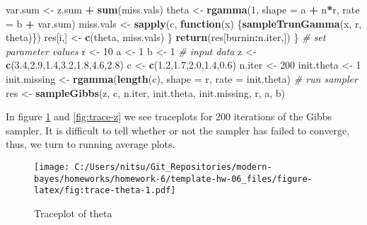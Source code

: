 \documentclass[
]{article}
\newenvironment{Shaded}{\begin{snugshade}}{\end{snugshade}}
\newcommand{\CommentTok}[1]{\textcolor[rgb]{0.56,0.35,0.01}{\textit{#1}}}
\newcommand{\ControlFlowTok}[1]{\textcolor[rgb]{0.13,0.29,0.53}{\textbf{#1}}}
\newcommand{\DataTypeTok}[1]{\textcolor[rgb]{0.13,0.29,0.53}{#1}}
\newcommand{\DecValTok}[1]{\textcolor[rgb]{0.00,0.00,0.81}{#1}}
\newcommand{\FloatTok}[1]{\textcolor[rgb]{0.00,0.00,0.81}{#1}}
\newcommand{\KeywordTok}[1]{\textcolor[rgb]{0.13,0.29,0.53}{\textbf{#1}}}
\newcommand{\NormalTok}[1]{#1}
\newcommand{\OperatorTok}[1]{\textcolor[rgb]{0.81,0.36,0.00}{\textbf{#1}}}
\newcommand{\StringTok}[1]{\textcolor[rgb]{0.31,0.60,0.02}{#1}}
\begin{document}
\begin{Shaded}
\begin{Highlighting}[]
\NormalTok{    var.sum \textless{}{-}}\StringTok{ }\NormalTok{z.sum }\OperatorTok{+}\StringTok{ }\KeywordTok{sum}\NormalTok{(miss.vals)}
\NormalTok{    theta \textless{}{-}}\StringTok{ }\KeywordTok{rgamma}\NormalTok{(}\DecValTok{1}\NormalTok{, }\DataTypeTok{shape =}\NormalTok{ a }\OperatorTok{+}\StringTok{ }\NormalTok{n}\OperatorTok{*}\NormalTok{r, }\DataTypeTok{rate =}\NormalTok{ b }\OperatorTok{+}\StringTok{ }\NormalTok{var.sum)}
\NormalTok{    miss.vals \textless{}{-}}\StringTok{ }\KeywordTok{sapply}\NormalTok{(c, }\ControlFlowTok{function}\NormalTok{(x) \{}\KeywordTok{sampleTrunGamma}\NormalTok{(x, r, theta)\})}
\NormalTok{    res[i,] \textless{}{-}}\StringTok{ }\KeywordTok{c}\NormalTok{(theta, miss.vals)}
\NormalTok{  \}}
  \KeywordTok{return}\NormalTok{(res[burnin}\OperatorTok{:}\NormalTok{n.iter,])}
\NormalTok{\}}
\CommentTok{\# set parameter values}
\NormalTok{r \textless{}{-}}\StringTok{ }\DecValTok{10}
\NormalTok{a \textless{}{-}}\StringTok{ }\DecValTok{1}
\NormalTok{b \textless{}{-}}\StringTok{ }\DecValTok{1}
\CommentTok{\# input data}
\NormalTok{z \textless{}{-}}\StringTok{ }\KeywordTok{c}\NormalTok{(}\FloatTok{3.4}\NormalTok{,}\FloatTok{2.9}\NormalTok{,}\FloatTok{1.4}\NormalTok{,}\FloatTok{3.2}\NormalTok{,}\FloatTok{1.8}\NormalTok{,}\FloatTok{4.6}\NormalTok{,}\FloatTok{2.8}\NormalTok{)}
\NormalTok{c \textless{}{-}}\StringTok{ }\KeywordTok{c}\NormalTok{(}\FloatTok{1.2}\NormalTok{,}\FloatTok{1.7}\NormalTok{,}\FloatTok{2.0}\NormalTok{,}\FloatTok{1.4}\NormalTok{,}\FloatTok{0.6}\NormalTok{)}
\NormalTok{n.iter \textless{}{-}}\StringTok{ }\DecValTok{200}
\NormalTok{init.theta \textless{}{-}}\StringTok{ }\DecValTok{1}
\NormalTok{init.missing \textless{}{-}}\StringTok{ }\KeywordTok{rgamma}\NormalTok{(}\KeywordTok{length}\NormalTok{(c), }\DataTypeTok{shape =}\NormalTok{ r, }\DataTypeTok{rate =}\NormalTok{ init.theta)}
\CommentTok{\# run sampler}
\NormalTok{res \textless{}{-}}\StringTok{ }\KeywordTok{sampleGibbs}\NormalTok{(z, c, n.iter, init.theta, init.missing, r, a, b)}
\end{Highlighting}
\end{Shaded}

In figure \ref{fig:trace-theta} and \ref{fig:trace-z} we see traceplots
for 200 iterations of the Gibbs sampler. It is difficult to tell whether
or not the sampler has failed to converge, thus, we turn to running
average plots.

\begin{figure}
\centering
\texttt{[image: C:/Users/nitsu/Git\_Repositories/modern-bayes/homeworks/homework-6/template-hw-06\_files/figure-latex/fig:trace-theta-1.pdf]}
\caption{\label{fig:trace-theta}Traceplot of theta}
\end{figure}
\end{document}

